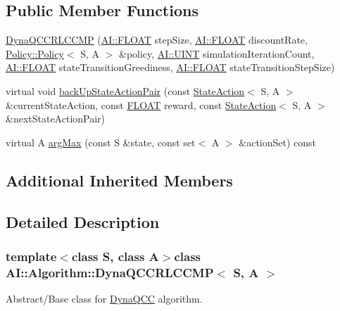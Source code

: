 \subsection*{Public Member Functions}
\begin{DoxyCompactItemize}
\item 
\hyperlink{classAI_1_1Algorithm_1_1DynaQCCRLCCMP_a892dd156f280dd375d7f248258531043}{Dyna\-Q\-C\-C\-R\-L\-C\-C\-M\-P} (\hyperlink{namespaceAI_a41b74884a20833db653dded3918e05c3}{A\-I\-::\-F\-L\-O\-A\-T} step\-Size, \hyperlink{namespaceAI_a41b74884a20833db653dded3918e05c3}{A\-I\-::\-F\-L\-O\-A\-T} discount\-Rate, \hyperlink{classAI_1_1Algorithm_1_1Policy_1_1Policy}{Policy\-::\-Policy}$<$ S, A $>$ \&policy, \hyperlink{namespaceAI_ab6e14dc1e659854858a87e511f1439ec}{A\-I\-::\-U\-I\-N\-T} simulation\-Iteration\-Count, \hyperlink{namespaceAI_a41b74884a20833db653dded3918e05c3}{A\-I\-::\-F\-L\-O\-A\-T} state\-Transition\-Greediness, \hyperlink{namespaceAI_a41b74884a20833db653dded3918e05c3}{A\-I\-::\-F\-L\-O\-A\-T} state\-Transition\-Step\-Size)
\item 
virtual void \hyperlink{classAI_1_1Algorithm_1_1DynaQCCRLCCMP_aebff9b81db5bd2ae33bd3d6662539bc0}{back\-Up\-State\-Action\-Pair} (const \hyperlink{classAI_1_1StateAction}{State\-Action}$<$ S, A $>$ \&current\-State\-Action, const \hyperlink{namespaceAI_a41b74884a20833db653dded3918e05c3}{F\-L\-O\-A\-T} reward, const \hyperlink{classAI_1_1StateAction}{State\-Action}$<$ S, A $>$ \&next\-State\-Action\-Pair)
\item 
virtual A \hyperlink{classAI_1_1Algorithm_1_1DynaQCCRLCCMP_a145fa4fdba2289842a77c9d483a42ef2}{arg\-Max} (const S \&state, const set$<$ A $>$ \&action\-Set) const 
\end{DoxyCompactItemize}
\subsection*{Additional Inherited Members}


\subsection{Detailed Description}
\subsubsection*{template$<$class S, class A$>$class A\-I\-::\-Algorithm\-::\-Dyna\-Q\-C\-C\-R\-L\-C\-C\-M\-P$<$ S, A $>$}

Abstract/\-Base class for \hyperlink{classAI_1_1Algorithm_1_1DynaQCC}{Dyna\-Q\-C\-C} algorithm. 


